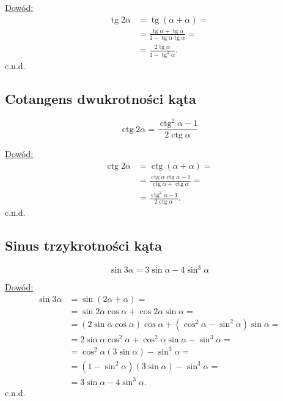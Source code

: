 \documentclass[12pt,a4paper,fleqn]{article}
\DeclareMathOperator{\tg}{tg}
\DeclareMathOperator{\ctg}{ctg}
\begin{document}
		\underline{Dowód:} \noindent
		\begin{align*}
		\tg2\alpha &= \tg(\alpha+\alpha)= \\
				   &= \frac{\tg \alpha + \tg \alpha}{1 - \tg \alpha \tg \alpha} =\\
				   &=\frac{2\tg \alpha}{1 - \tg^2 \alpha}.
		\end{align*}
		c.n.d.

	\subsection{Cotangens dwukrotności kąta}
		\begin{equation*}
			\ctg2\alpha = \frac{\ctg^2\alpha-1}{2\ctg\alpha}
		\end{equation*}
		
		\underline{Dowód:} \noindent
		\begin{align*}
			\ctg2\alpha &= \ctg(\alpha+\alpha) =\\
						&= \frac{\ctg\alpha\ctg\alpha-1}{\ctg\alpha+\ctg\alpha} =\\
						&= \frac{\ctg^2\alpha-1}{2\ctg\alpha}.
		\end{align*}
		c.n.d.
		
	\subsection{Sinus trzykrotności kąta}
		\begin{equation*}
			\sin3\alpha = 3\sin\alpha -4\sin^3\alpha
		\end{equation*}
		
		\underline{Dowód:} \noindent
		\begin{align*}
			\sin3\alpha &= \sin(2\alpha+\alpha) = \\
						  &= \sin2\alpha\cos\alpha+\cos 2\alpha\sin\alpha =\\
						  &= (2\sin\alpha\cos\alpha)\cos\alpha + (\cos^2\alpha-\sin^2\alpha)\sin\alpha = \\
						  &= 2\sin\alpha\cos^2\alpha+\cos^2\alpha\sin\alpha-\sin^3\alpha =\\
						  &= \cos^2\alpha(3\sin\alpha) - \sin^3\alpha = \\
						  &= (1-\sin^2\alpha)(3\sin\alpha) - \sin^3\alpha =\\
						  &= 3\sin\alpha -4\sin^3\alpha.
		\end{align*}
		c.n.d.
\end{document}

